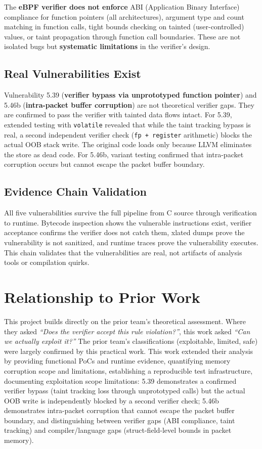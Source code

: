 \noindent
The \textbf{eBPF verifier does not enforce} ABI (Application Binary Interface) compliance for function pointers (all architectures), argument type and count matching in function calls, tight bounds checking on tainted (user-controlled) values, or taint propagation through function call boundaries. These are not isolated bugs but \textbf{systematic limitations} in the verifier's design.

\subsection{Real Vulnerabilities Exist}

\noindent
Vulnerability 5.39 (\textbf{verifier bypass via unprototyped function pointer}) and 5.46b (\textbf{intra-packet buffer corruption}) are not theoretical verifier gaps. They are confirmed to pass the verifier with tainted data flows intact. For 5.39, extended testing with \texttt{volatile} revealed that while the taint tracking bypass is real, a second independent verifier check (\texttt{fp + register} arithmetic) blocks the actual OOB stack write. The original code loads only because LLVM eliminates the store as dead code. For 5.46b, variant testing confirmed that intra-packet corruption occurs but cannot escape the packet buffer boundary.

\subsection{Evidence Chain Validation}

\noindent
All five vulnerabilities survive the full pipeline from C source through verification to runtime. Bytecode inspection shows the vulnerable instructions exist, verifier acceptance confirms the verifier does not catch them, xlated dumps prove the vulnerability is not sanitized, and runtime traces prove the vulnerability executes. This chain validates that the vulnerabilities are real, not artifacts of analysis tools or compilation quirks.

\section{Relationship to Prior Work}

\noindent
This project builds directly on the prior team's theoretical assessment. Where they asked \textit{``Does the verifier accept this rule violation?''}, this work asked \textit{``Can we actually exploit it?''} The prior team's classifications (exploitable, limited, safe) were largely confirmed by this practical work. This work extended their analysis by providing functional PoCs and runtime evidence, quantifying memory corruption scope and limitations, establishing a reproducible test infrastructure, documenting exploitation scope limitations: 5.39 demonstrates a confirmed verifier bypass (taint tracking loss through unprototyped calls) but the actual OOB write is independently blocked by a second verifier check; 5.46b demonstrates intra-packet corruption that cannot escape the packet buffer boundary, and distinguishing between verifier gaps (ABI compliance, taint tracking) and compiler/language gaps (struct-field-level bounds in packet memory).

